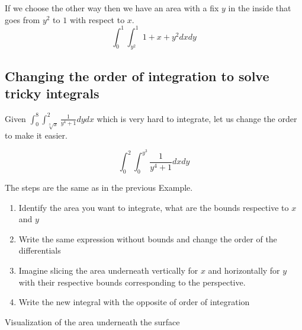 If we choose the other way then we have an area with a fix \(y\) in the inside that goes from \(y^2\) to \(1\) with respect to \(x\).
\[
\int_{0}^{1}\int_{y^2}^{1} 1 + x + y^2 dx dy
\]

\subsection{Changing the order of integration to solve tricky integrals}

Given \(\int_{0}^{8}\int_{\sqrt[3]{x}}^{2} \frac{1}{y^4 +1}dy dx\) which is very hard to integrate, let us change the order
to make it easier.

\[\int_{0}^{2}\int_{0}^{y^3} \frac{1}{y^4 +1}dx dy\]

The steps are the same as in the previous Example.

\begin{enumerate}
    \item Identify the area you want to integrate, what are the bounds respective to \(x\) and \(y\)
    \item Write the same expression without bounds and change the order of the differentials
    \item Imagine slicing the area underneath vertically for \(x\) and horizontally for \(y\) with their respective bounds corresponding
    to the perspective.
    \item Write the new integral with the opposite of order of integration
\end{enumerate}

\begin{center}

    Visualization of the area underneath the surface
    \smallskip

\end{center}

